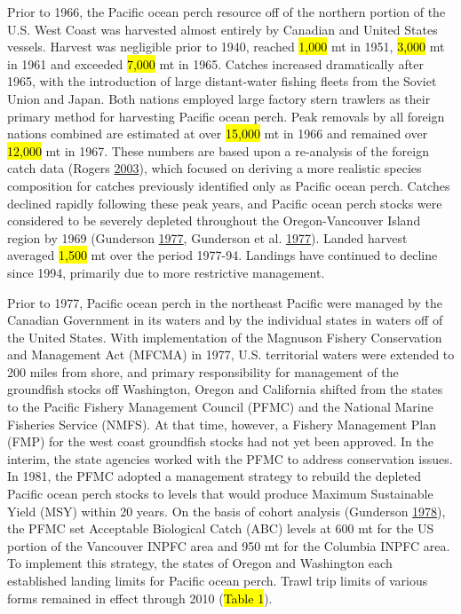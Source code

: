\documentclass[12pt,]{article}
\begin{document}
Prior to 1966, the Pacific ocean perch resource off of the northern
portion of the U.S. West Coast was harvested almost entirely by Canadian
and United States vessels. Harvest was negligible prior to 1940, reached
\hl{1,000} mt in 1951, \hl{3,000} mt in 1961 and exceeded \hl{7,000} mt
in 1965. Catches increased dramatically after 1965, with the
introduction of large distant-water fishing fleets from the Soviet Union
and Japan. Both nations employed large factory stern trawlers as their
primary method for harvesting Pacific ocean perch. Peak removals by all
foreign nations combined are estimated at over \hl{15,000} mt in 1966
and remained over \hl{12,000} mt in 1967. These numbers are based upon a
re-analysis of the foreign catch data (Rogers
\protect\hyperlink{ref-rogers_species_2003}{2003}), which focused on
deriving a more realistic species composition for catches previously
identified only as Pacific ocean perch. Catches declined rapidly
following these peak years, and Pacific ocean perch stocks were
considered to be severely depleted throughout the Oregon-Vancouver
Island region by 1969 (Gunderson
\protect\hyperlink{ref-gunderson_population_1977}{1977}, Gunderson et
al. \protect\hyperlink{ref-gunderson_status_1977}{1977}). Landed harvest
averaged \hl{1,500} mt over the period 1977-94. Landings have continued
to decline since 1994, primarily due to more restrictive management.

Prior to 1977, Pacific ocean perch in the northeast Pacific were managed
by the Canadian Government in its waters and by the individual states in
waters off of the United States. With implementation of the Magnuson
Fishery Conservation and Management Act (MFCMA) in 1977, U.S.
territorial waters were extended to 200 miles from shore, and primary
responsibility for management of the groundfish stocks off Washington,
Oregon and California shifted from the states to the Pacific Fishery
Management Council (PFMC) and the National Marine Fisheries Service
(NMFS). At that time, however, a Fishery Management Plan (FMP) for the
west coast groundfish stocks had not yet been approved. In the interim,
the state agencies worked with the PFMC to address conservation issues.
In 1981, the PFMC adopted a management strategy to rebuild the depleted
Pacific ocean perch stocks to levels that would produce Maximum
Sustainable Yield (MSY) within 20 years. On the basis of cohort analysis
(Gunderson \protect\hyperlink{ref-gunderson_results_1978}{1978}), the
PFMC set Acceptable Biological Catch (ABC) levels at 600 mt for the US
portion of the Vancouver INPFC area and 950 mt for the Columbia INPFC
area. To implement this strategy, the states of Oregon and Washington
each established landing limits for Pacific ocean perch. Trawl trip
limits of various forms remained in effect through 2010 (\hl{Table 1}).
\end{document}
